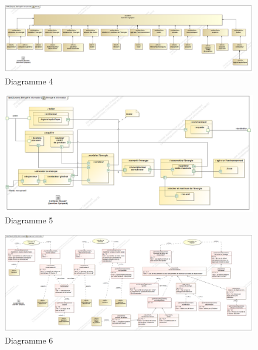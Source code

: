 \begin{figure}[ht!]
\begin{center}
 \includegraphics[width=\linewidth]{img/diagram4}
\end{center}
\caption{\label{figure4} Diagramme 4}
\end{figure}

\newpage

\begin{figure}[ht!]
\begin{center}
 \includegraphics[width=\linewidth]{img/diagram5}
\end{center}
\caption{\label{figure5} Diagramme 5}
\end{figure}

\begin{figure}[ht!]
\begin{center}
 \includegraphics[width=\linewidth]{img/diagram6}
\end{center}
\caption{\label{figure6} Diagramme 6}
\end{figure}

